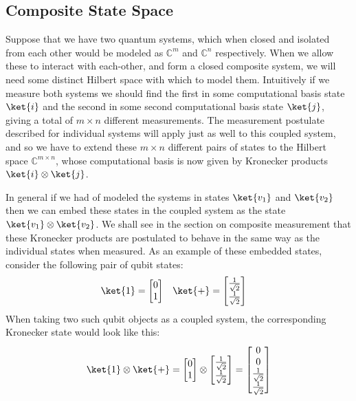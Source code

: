 \subsection{Composite State Space}
Suppose that we have two quantum systems, which when closed and isolated from each other would be modeled as $\mathbb{C}^m$ and $\mathbb{C}^n$ respectively. When we allow these to interact with each-other, and form a closed composite system, we will need some distinct Hilbert space with which to model them. Intuitively if we measure both systems we should find the first in some computational basis state $\ket{i}$ and the second in some second computational basis state $\ket{j}$, giving a total of $m \times n$ different measurements. The measurement postulate described for individual systems will apply just as well to this coupled system, and so we have to extend these $m \times n$ different pairs of states to the Hilbert space $\mathbb{C}^{m \times n}$, whose computational basis is now given by Kronecker products $\ket{i} \otimes \ket{j}$.

In general if we had of modeled the systems in states $\ket{v_1}$ and $\ket{v_2}$ then we can embed these states in the coupled system as the state $\ket{v_1} \otimes \ket{v_2}$. We shall see in the section on composite measurement that these Kronecker products are postulated to behave in the same way as the individual states when measured. As an example of these embedded states, consider the following pair of qubit states:
\begin{align*}
\ket{1} = \left[\begin{matrix}0\\1\end{matrix}\right]
&&&
\ket{+} = \left[\begin{matrix}\frac{1}{\sqrt{2}}\\\frac{1}{\sqrt{2}}\end{matrix}\right]
\end{align*}
When taking two such qubit objects as a coupled system, the corresponding Kronecker state would look like this:
\[
\ket{1}\otimes \ket{+} = \left[\begin{matrix}0\\1\end{matrix}\right]
\otimes
\left[\begin{matrix}\frac{1}{\sqrt{2}}\\\frac{1}{\sqrt{2}}\end{matrix}\right]
=
\left[\begin{matrix}0\\0\\\frac{1}{\sqrt{2}}\\\frac{1}{\sqrt{2}}\end{matrix}\right]
\]

